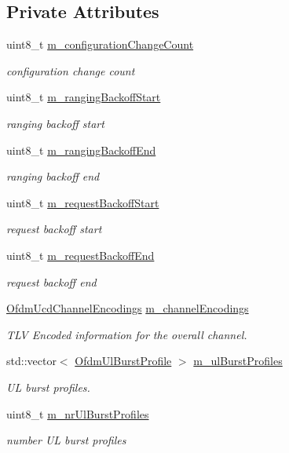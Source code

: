 \subsection*{Private Attributes}
\begin{DoxyCompactItemize}
\item 
uint8\+\_\+t \hyperlink{classns3_1_1Ucd_ad8588333860e7ee98bf544151dde0547}{m\+\_\+configuration\+Change\+Count}
\begin{DoxyCompactList}\small\item\em configuration change count \end{DoxyCompactList}\item 
uint8\+\_\+t \hyperlink{classns3_1_1Ucd_a2bb56a9a68e0d2db278e6ad4ec9c79d2}{m\+\_\+ranging\+Backoff\+Start}
\begin{DoxyCompactList}\small\item\em ranging backoff start \end{DoxyCompactList}\item 
uint8\+\_\+t \hyperlink{classns3_1_1Ucd_a3d2a0adbdf513ce664f981286c38fdc5}{m\+\_\+ranging\+Backoff\+End}
\begin{DoxyCompactList}\small\item\em ranging backoff end \end{DoxyCompactList}\item 
uint8\+\_\+t \hyperlink{classns3_1_1Ucd_a349ad1738aaa8cb6f50dbba40be0a452}{m\+\_\+request\+Backoff\+Start}
\begin{DoxyCompactList}\small\item\em request backoff start \end{DoxyCompactList}\item 
uint8\+\_\+t \hyperlink{classns3_1_1Ucd_a347ffdff28ebe47d4db585c35780e54d}{m\+\_\+request\+Backoff\+End}
\begin{DoxyCompactList}\small\item\em request backoff end \end{DoxyCompactList}\item 
\hyperlink{classns3_1_1OfdmUcdChannelEncodings}{Ofdm\+Ucd\+Channel\+Encodings} \hyperlink{classns3_1_1Ucd_afe2c90d9bf2fd6c010743784cdb55dd8}{m\+\_\+channel\+Encodings}
\begin{DoxyCompactList}\small\item\em T\+LV Encoded information for the overall channel. \end{DoxyCompactList}\item 
std\+::vector$<$ \hyperlink{classns3_1_1OfdmUlBurstProfile}{Ofdm\+Ul\+Burst\+Profile} $>$ \hyperlink{classns3_1_1Ucd_ace3bf982ecc970c46f96b8c561df29b7}{m\+\_\+ul\+Burst\+Profiles}
\begin{DoxyCompactList}\small\item\em UL burst profiles. \end{DoxyCompactList}\item 
uint8\+\_\+t \hyperlink{classns3_1_1Ucd_a1f48b85ec8e263a0ec5b59e9f5f6b5d4}{m\+\_\+nr\+Ul\+Burst\+Profiles}
\begin{DoxyCompactList}\small\item\em number UL burst profiles \end{DoxyCompactList}\end{DoxyCompactItemize}
